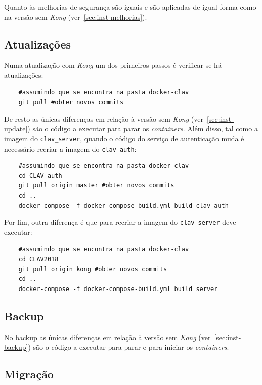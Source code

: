 Quanto às melhorias de segurança são iguais e são aplicadas de igual forma como na versão sem \textit{Kong} (ver~\ref{sec:inst-melhorias}).

\subsection{Atualizações}

Numa atualização com \textit{Kong} um dos primeiros passos é verificar se há atualizações:
\footnotesize
\begin{verbatim}
    #assumindo que se encontra na pasta docker-clav
    git pull #obter novos commits
\end{verbatim}
\normalsize

De resto as únicas diferenças em relação à versão sem \textit{Kong} (ver~\ref{sec:inst-update}) são o código a executar para parar os \textit{containers}. Além disso, tal como a imagem do \texttt{clav\_server}, quando o código do serviço de autenticação muda é necessário recriar a imagem do \texttt{clav-auth}:

\footnotesize
\begin{verbatim}
    #assumindo que se encontra na pasta docker-clav
    cd CLAV-auth
    git pull origin master #obter novos commits
    cd ..
    docker-compose -f docker-compose-build.yml build clav-auth
\end{verbatim}
\normalsize

Por fim, outra diferença é que para recriar a imagem do \texttt{clav\_server} deve executar:

\footnotesize
\begin{verbatim}
    #assumindo que se encontra na pasta docker-clav
    cd CLAV2018
    git pull origin kong #obter novos commits
    cd ..
    docker-compose -f docker-compose-build.yml build server
\end{verbatim}
\normalsize

\subsection{Backup}

No backup as únicas diferenças em relação à versão sem \textit{Kong} (ver~\ref{sec:inst-backup}) são o código a executar para parar e para iniciar os \textit{containers}.

\subsection{Migração}

